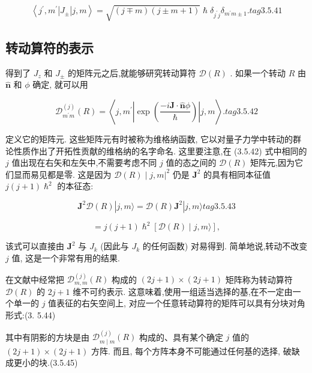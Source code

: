$$
\left\langle {{j}^{\prime },{m}^{\prime }\left| {J}_{ \pm }\right| j, m}\right\rangle = \sqrt{\left( {j \mp m}\right) \left( {j \pm m + 1}\right) }\hslash {\delta }_{{j}^{\prime }j}{\delta }_{{m}^{\prime }m \pm 1}. tag{3. 5.41}
$$

\subsection{转动算符的表示}

得到了 ${J}_{z}$ 和 ${J}_{ \pm }$ 的矩阵元之后,就能够研究转动算符 $\mathcal{D}\left( R\right)$ . 如果一个转动 $R$ 由 $\widehat{\mathbf{n}}$ 和 $\phi$ 确定, 就可以用

$$
{\mathcal{D}}_{{m}^{\prime }m}^{\left( j\right) }\left( R\right) = \left\langle {j,{m}^{\prime }\left| {\exp \left( \frac{-i\mathbf{J} \cdot \widehat{\mathbf{n}}\phi }{\hslash }\right) }\right| j, m}\right\rangle . tag{3. 5.42}
$$

定义它的矩阵元. 这些矩阵元有时被称为维格纳函数, 它以对量子力学中转动的群论性质作出了开拓性贡献的维格纳的名字命名. 这里要注意,在 (3.5.42) 式中相同的 $j$ 值出现在右矢和左矢中,不需要考虑不同 $j$ 值的态之间的 $\mathcal{D}\left( R\right)$ 矩阵元,因为它们显而易见都是零. 这是因为 ${\left. \mathcal{D}\left( R\right) \mid j, m\right| }^{2}$ 仍是 ${\mathbf{J}}^{2}$ 的具有相同本征值 $j\left( {j + 1}\right) {\hslash }^{2}$ 的本征态:

$$
{\mathbf{J}}^{2}\mathcal{D}\left( R\right) \left| {j, m\rangle = \mathcal{D}\left( R\right) {\mathbf{J}}^{2}}\right| j, m\rangle tag{3. 5.43}
$$

$$
= j\left( {j + 1}\right) {\hslash }^{2}\left\lbrack {\mathcal{D}\left( R\right) \mid j, m\rangle }\right\rbrack ,
$$

该式可以直接由 ${\mathbf{J}}^{2}$ 与 ${J}_{k}$ (因此与 ${J}_{k}$ 的任何函数) 对易得到. 简单地说,转动不改变 $j$ 值, 这是一个非常有用的结果.

在文献中经常把 ${\mathcal{D}}_{m, m}^{\left( j\right) }\left( R\right)$ 构成的 $\left( {{2j} + 1}\right) \times \left( {{2j} + 1}\right)$ 矩阵称为转动算符 $\mathcal{D}\left( R\right)$ 的 ${2j} + 1$ 维不可约表示. 这意味着,使用一组适当选择的基,在不一定由一个单一的 $j$ 值表征的右矢空间上, 对应一个任意转动算符的矩阵可以具有分块对角形式:(3. 5.44)


其中有阴影的方块是由 ${\mathcal{D}}_{m \mid m}^{\left( j\right) }\left( R\right)$ 构成的、具有某个确定 $j$ 值的 $\left( {{2j} + 1}\right) \times \left( {{2j} + 1}\right)$ 方阵. 而且, 每个方阵本身不可能通过任何基的选择, 破缺成更小的块.(3.5.45)



